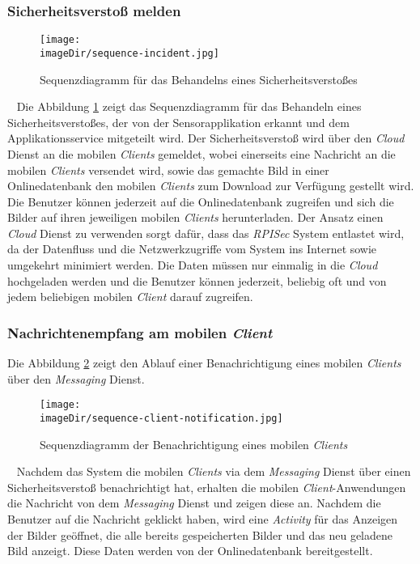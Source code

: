 \subsubsection{Sicherheitsverstoß melden}
\begin{figure}[h]
	\centering
	\texttt{[image: \\imageDir/sequence-incident.jpg]}
	\caption{Sequenzdiagramm für das Behandelns eines Sicherheitsverstoßes}
	\label{fig:image-sequence-incident}
\end{figure}
\ \newline
Die Abbildung \ref{fig:image-sequence-incident} zeigt das Sequenzdiagramm für das Behandeln eines Sicherheitsverstoßes, der von der Sensorapplikation erkannt und dem Applikationsservice mitgeteilt wird. Der Sicherheitsverstoß wird über den \emph{Cloud} Dienst an die mobilen \emph{Clients} gemeldet, wobei einerseits eine Nachricht an die mobilen \emph{Clients} versendet wird, sowie das gemachte Bild in einer Onlinedatenbank den mobilen \emph{Clients} zum Download zur Verfügung gestellt wird. Die Benutzer können jederzeit auf die Onlinedatenbank zugreifen und sich die Bilder auf ihren jeweiligen mobilen \emph{Clients} herunterladen. 
\newline
\newline
Der Ansatz einen \emph{Cloud} Dienst zu verwenden sorgt dafür, dass das \emph{RPISec} System entlastet wird, da der Datenfluss und die Netzwerkzugriffe vom System ins Internet sowie umgekehrt minimiert werden. Die Daten müssen nur einmalig in die \emph{Cloud} hochgeladen werden und die Benutzer können jederzeit, beliebig oft und von jedem beliebigen mobilen \emph{Client} darauf zugreifen.
\newpage
 
\subsubsection{Nachrichtenempfang am mobilen \emph{Client}}
Die Abbildung \ref{fig:image-sequence-client-notification} zeigt den Ablauf einer Benachrichtigung eines mobilen \emph{Clients} über den \emph{Messaging} Dienst.
\begin{figure}[h]
	\centering
	\texttt{[image: \\imageDir/sequence-client-notification.jpg]}
	\caption{Sequenzdiagramm der Benachrichtigung eines mobilen \emph{Clients}}
	\label{fig:image-sequence-client-notification}
\end{figure}
\ \newline
Nachdem das System die mobilen \emph{Clients} via dem \emph{Messaging} Dienst über einen Sicherheitsverstoß benachrichtigt hat, erhalten die mobilen \emph{Client}-Anwendungen die Nachricht von dem \emph{Messaging} Dienst und zeigen diese an. Nachdem die Benutzer auf die Nachricht geklickt haben, wird eine \emph{Activity} für das Anzeigen der Bilder geöffnet, die alle bereits gespeicherten Bilder und das neu geladene Bild anzeigt. Diese Daten werden von der Onlinedatenbank bereitgestellt. 